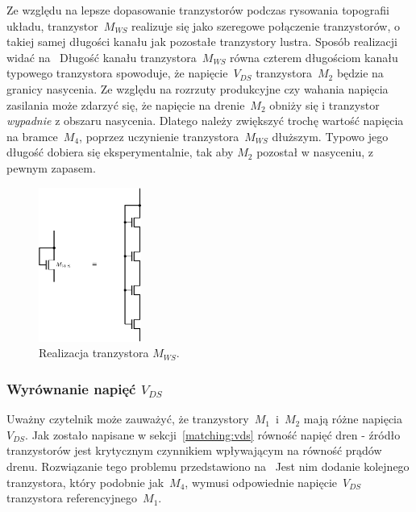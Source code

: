 \documentclass[twoside,pl,final]{labman}
\begin{document}
Ze względu na lepsze dopasowanie tranzystorów podczas
rysowania topografii układu,
tranzystor~$M_{WS}$ realizuje się jako szeregowe połączenie tranzystorów,
o takiej samej długości kanału jak pozostałe tranzystory lustra.
Sposób realizacji widać na~
Długość kanału tranzystora~$M_{WS}$ równa czterem długościom
kanału typowego tranzystora spowoduje,
że napięcie~$V_{DS}$ tranzystora~$M_2$ będzie na granicy nasycenia.
Ze względu na rozrzuty produkcyjne czy wahania napięcia zasilania
może zdarzyć się, że napięcie na drenie~$M_2$ obniży się i tranzystor
\emph{wypadnie} z obszaru nasycenia.
Dlatego należy zwiększyć trochę wartość napięcia na bramce~$M_4$,
poprzez uczynienie tranzystora~$M_{WS}$ dłuższym.
Typowo jego długość dobiera się eksperymentalnie,
tak aby $M_2$ pozostał w nasyceniu, z pewnym zapasem.

\begin{figure}[!htbp]
  \centering
  \includegraphics[width=0.3\textwidth]{cascode_mws}
  \caption{Realizacja tranzystora $M_{WS}$.}
  \label{fig:cascode:wideswing:mws}
\end{figure}

\subsubsection{Wyrównanie napięć $V_{DS}$}
\label{cascode:wideswing:vds}

Uważny czytelnik może zauważyć, że tranzystory~$M_1$~i~$M_2$
mają różne napięcia~$V_{DS}$.
Jak zostało napisane w sekcji~\ref{matching:vds}
równość napięć dren - źródło tranzystorów jest krytycznym czynnikiem
wpływającym na równość prądów drenu.
Rozwiązanie tego problemu przedstawiono na~
Jest nim dodanie kolejnego tranzystora, który podobnie jak~$M_4$,
wymusi odpowiednie napięcie~$V_{DS}$ tranzystora referencyjnego~$M_1$.
\end{document}
